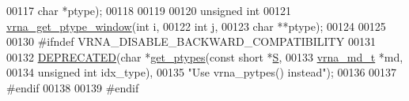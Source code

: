 \begin{DoxyCode}
00117                \textcolor{keywordtype}{char} *ptype);
00118 
00119 
00120 \textcolor{keywordtype}{unsigned} \textcolor{keywordtype}{int}
00121 \mbox{\hyperlink{group__utils_gab134b2a70a6933b7f3aada9abdc7b96e}{vrna\_get\_ptype\_window}}(\textcolor{keywordtype}{int}   i,
00122                       \textcolor{keywordtype}{int}   j,
00123                       \textcolor{keywordtype}{char}  **ptype);
00124 
00125 
00130 \textcolor{preprocessor}{#ifndef VRNA\_DISABLE\_BACKWARD\_COMPATIBILITY}
00131 
00132 \mbox{\hyperlink{alphabet_8h_aab347a3c03fbe8e7319551b9fa0cce4a}{DEPRECATED}}(\textcolor{keywordtype}{char} *\mbox{\hyperlink{alphabet_8h_a3081b67381e066d6e835aaf8a466899d}{get\_ptypes}}(\textcolor{keyword}{const} \textcolor{keywordtype}{short}   *\mbox{\hyperlink{group__energy__parameters__rw_gga7bf2bb363bcf5ce50d60255d256e5682af1ce01387d2348f8b858721a7db81670}{S}},
00133                             \mbox{\hyperlink{group__model__details_structvrna__md__s}{vrna\_md\_t}}     *md,
00134                             \textcolor{keywordtype}{unsigned} \textcolor{keywordtype}{int}  idx\_type),
00135           \textcolor{stringliteral}{"Use vrna\_pytpes() instead"});
00136 
00137 \textcolor{preprocessor}{#endif}
00138 
00139 \textcolor{preprocessor}{#endif}
\end{DoxyCode}
